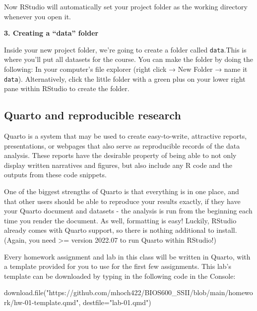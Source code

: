 \documentclass[
  letterpaper,
  DIV=11,
  numbers=noendperiod]{scrartcl}
\newenvironment{Shaded}{\begin{snugshade}}{\end{snugshade}}
\newcommand{\AttributeTok}[1]{\textcolor[rgb]{0.40,0.45,0.13}{#1}}
\newcommand{\FunctionTok}[1]{\textcolor[rgb]{0.28,0.35,0.67}{#1}}
\newcommand{\NormalTok}[1]{\textcolor[rgb]{0.00,0.23,0.31}{#1}}
\newcommand{\StringTok}[1]{\textcolor[rgb]{0.13,0.47,0.30}{#1}}
\begin{document}
Now RStudio will automatically set your project folder as the working
directory whenever you open it.

\textbf{3. Creating a ``data'' folder}

Inside your new project folder, we're going to create a folder called
\texttt{data}.This is where you'll put all datasets for the course. You
can make the folder by doing the following: In your computer's file
explorer (right click → New Folder → name it \texttt{data}).
Alternatively, click the little folder with a green plus on your lower
right pane within RStudio to create the folder.

\subsection{Quarto and reproducible
research}\label{quarto-and-reproducible-research}

Quarto is a system that may be used to create easy-to-write, attractive
reports, presentations, or webpages that also serve as reproducible
records of the data analysis. These reports have the desirable property
of being able to not only display written narratives and figures, but
also include any R code and the outputs from these code snippets.

One of the biggest strengths of Quarto is that everything is in one
place, and that other users should be able to reproduce your results
exactly, if they have your Quarto document and datasets - the analysis
is run from the beginning each time you render the document. As well,
formatting is easy! Luckily, RStudio already comes with Quarto support,
so there is nothing additional to install. (Again, you need
\textgreater= version 2022.07 to run Quarto within RStudio!)

Every homework assignment and lab in this class will be written in
Quarto, with a template provided for you to use for the first few
assignments. This lab's template can be downloaded by typing in the
following code in the Console:

\begin{Shaded}
\begin{Highlighting}[]
\FunctionTok{download.file}\NormalTok{(}\StringTok{"https://github.com/mhoch422/BIOS600\_SSII/blob/main/homework/hw{-}01{-}template.qmd"}\NormalTok{, }\AttributeTok{destfile=}\StringTok{"lab{-}01.qmd"}\NormalTok{)}
\end{Highlighting}
\end{Shaded}
\end{document}
